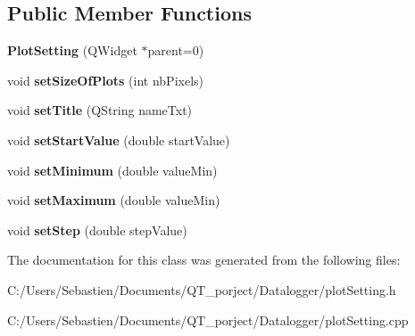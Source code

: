 \subsection*{Public Member Functions}
\begin{DoxyCompactItemize}
\item 
\mbox{\label{class_plot_setting_a3d80a7541225518d56a0e02901d8b2bd}} 
{\bfseries Plot\+Setting} (Q\+Widget $\ast$parent=0)
\item 
\mbox{\label{class_plot_setting_a1f3f91b9c3bd8c70163b41a99d4873dc}} 
void {\bfseries set\+Size\+Of\+Plots} (int nb\+Pixels)
\item 
\mbox{\label{class_plot_setting_a5b9fcff833c35f71f366f081b92794aa}} 
void {\bfseries set\+Title} (Q\+String name\+Txt)
\item 
\mbox{\label{class_plot_setting_a622b031dccb999b2c6c427fbd6501ccc}} 
void {\bfseries set\+Start\+Value} (double start\+Value)
\item 
\mbox{\label{class_plot_setting_ac55e0549e129997f0880e5858b908e67}} 
void {\bfseries set\+Minimum} (double value\+Min)
\item 
\mbox{\label{class_plot_setting_a8dce914c3d569b31e9b5aa234e2b28cf}} 
void {\bfseries set\+Maximum} (double value\+Min)
\item 
\mbox{\label{class_plot_setting_af2dfcb50308671a701c8511acc656b1d}} 
void {\bfseries set\+Step} (double step\+Value)
\end{DoxyCompactItemize}


The documentation for this class was generated from the following files\+:\begin{DoxyCompactItemize}
\item 
C\+:/\+Users/\+Sebastien/\+Documents/\+Q\+T\+\_\+porject/\+Datalogger/plot\+Setting.\+h\item 
C\+:/\+Users/\+Sebastien/\+Documents/\+Q\+T\+\_\+porject/\+Datalogger/plot\+Setting.\+cpp\end{DoxyCompactItemize}
